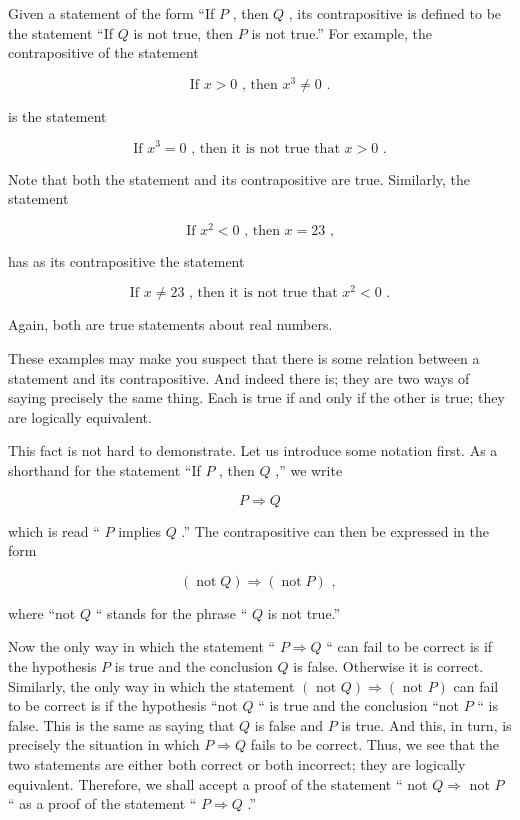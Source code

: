 Given a statement of the form ``If \(P\) , then \(Q\) , its contrapositive is defined to be the statement ``If \(Q\) is not true, then \(P\) is not true.'' For example, the contrapositive of the statement

\[
\text{ If }x > 0\text{ , then }{x}^{3} \neq  0\text{ . }
\]

is the statement

\[
\text{ If }{x}^{3} = 0\text{ , then it is not true that }x > 0\text{ . }
\]

Note that both the statement and its contrapositive are true. Similarly, the statement

\[
\text{ If }{x}^{2} < 0\text{ , then }x = {23}\text{ , }
\]

has as its contrapositive the statement

\[
\text{ If }x \neq  {23}\text{ , then it is not true that }{x}^{2} < 0\text{ . }
\]

Again, both are true statements about real numbers.

These examples may make you suspect that there is some relation between a statement and its contrapositive. And indeed there is; they are two ways of saying precisely the same thing. Each is true if and only if the other is true; they are logically equivalent.

This fact is not hard to demonstrate. Let us introduce some notation first. As a shorthand for the statement ``If \(P\) , then \(Q\) ,'' we write

\[
P \Rightarrow  Q
\]

which is read `` \(P\) implies \(Q\) .'' The contrapositive can then be expressed in the form

\[
\left( {\operatorname{not}Q}\right)  \Rightarrow  \left( {\operatorname{not}P}\right) \text{ , }
\]

where ``not \(Q\) `` stands for the phrase `` \(Q\) is not true.''

Now the only way in which the statement `` \(P \Rightarrow  Q\) `` can fail to be correct is if the hypothesis \(P\) is true and the conclusion \(Q\) is false. Otherwise it is correct. Similarly, the only way in which the statement \(\left( {\text{ not }Q}\right)  \Rightarrow  \left( {\text{ not }P}\right)\) can fail to be correct is if the hypothesis ``not \(Q\) `` is true and the conclusion ``not \(P\) `` is false. This is the same as saying that \(Q\) is false and \(P\) is true. And this, in turn, is precisely the situation in which \(P \Rightarrow  Q\) fails to be correct. Thus, we see that the two statements are either both correct or both incorrect; they are logically equivalent. Therefore, we shall accept a proof of the statement `` not \(Q \Rightarrow\) not \(P\) `` as a proof of the statement `` \(P \Rightarrow  Q\) .''

